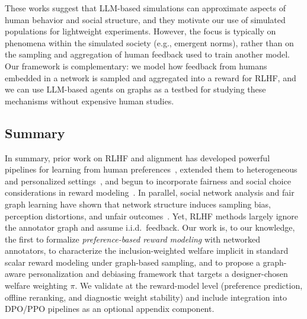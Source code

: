 \documentclass{article}
\theoremstyle{plain}
\theoremstyle{definition}
\theoremstyle{remark}
\begin{document}
These works suggest that LLM-based simulations can approximate aspects of human behavior and social structure, and they motivate our use of simulated populations for lightweight experiments.
However, the focus is typically on phenomena within the simulated society (e.g., emergent norms), rather than on the sampling and aggregation of human feedback used to train another model.
Our framework is complementary: we model how feedback from humans embedded in a network is sampled and aggregated into a reward for RLHF, and we can use LLM-based agents on graphs as a testbed for studying these mechanisms without expensive human studies.

\subsection{Summary}

In summary, prior work on RLHF and alignment has developed powerful pipelines for learning from human preferences~\citep{ouyang2022instructgpt,rafailov2023dpo,kaufmann2025survey,lambert2025rlhfbook,shen2023llmalignment}, extended them to heterogeneous and personalized settings~\citep{poddar2024vpl,li2024personalized_rlhf,liu2025shared_lora_prlhf,shenfeld2025reward_factorization,guan2025personalized_alignment_survey}, and begun to incorporate fairness and social choice considerations in reward modeling~\citep{chakraborty2024maxminrlhf,ramesh2024grpo,li2024optimizing_fair_stable,ouyang2025rewardfairness,song2025groupfair_rewardmodels,choi2025faro,ge2024axioms,dai2024mapping,conitzer2024socialchoice,halpern2025pairwise_calibrated,dumoulin2024density_pairwise}.
In parallel, social network analysis and fair graph learning have shown that network structure induces sampling bias, perception distortions, and unfair outcomes~\citep{wejnert2010rds,lerman2016majorityillusion,antunes2024minorityranking,dong2021edits,saxena2024fairsna,chen2023fairgnn_survey,laclau2024fairness_graphs_survey,wang2025fairgnn_wod}.
Yet, RLHF methods largely ignore the annotator graph and assume i.i.d.\ feedback.
Our work is, to our knowledge, the first to formalize \emph{preference-based reward
modeling} with networked annotators, to characterize the inclusion-weighted welfare
implicit in standard scalar reward modeling under graph-based sampling, and to propose
a graph-aware personalization and debiasing framework that targets a designer-chosen
welfare weighting $\pi$. We validate at the reward-model level (preference prediction,
offline reranking, and diagnostic weight stability) and include integration into
DPO/PPO pipelines as an optional appendix component.
\end{document}
